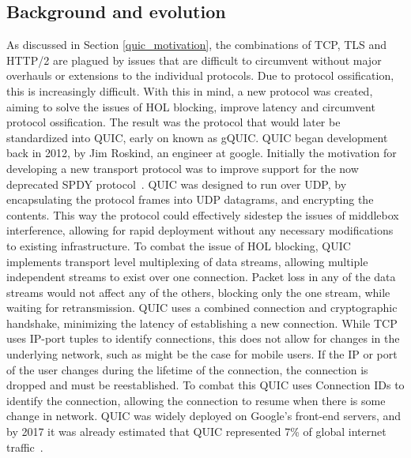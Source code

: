 \documentclass[english, 12pt, a4paper, elec, utf8, a-2b, online]{aaltothesis}
\begin{document}
\subsection{Background and evolution}
As discussed in Section \ref{quic_motivation}, the combinations of TCP, TLS and HTTP/2 are
plagued by issues that are difficult to circumvent without major overhauls or extensions to
the individual protocols. Due to protocol ossification, this is increasingly difficult. With
this in mind, a new protocol was created, aiming to solve the issues of
HOL blocking, improve latency and circumvent protocol ossification. The result
was the protocol that would later be standardized into QUIC, early on known as gQUIC.
QUIC began development back in 2012, by Jim Roskind, an engineer at google. Initially
the motivation for developing a new transport protocol was to improve support for
the now deprecated SPDY protocol~\cite{googleQUICDesign}. QUIC was designed to run over
UDP, by encapsulating the protocol frames into UDP datagrams, and encrypting the contents.
This way the protocol could effectively sidestep the issues of middlebox interference, allowing
for rapid deployment without any necessary modifications to existing infrastructure.
To combat the issue of HOL blocking, QUIC implements transport level multiplexing of
data streams, allowing multiple independent streams to exist over one connection.
Packet loss in any of the data streams would not affect any of the others, blocking
only the one stream, while waiting for retransmission. QUIC uses a combined connection and
cryptographic handshake, minimizing the latency of establishing a new connection.
While TCP uses IP-port tuples to identify connections, this does not allow for changes in the
underlying network, such as might be the case for mobile users. If the IP or port
of the user changes during the lifetime of the connection,
the connection is dropped and must be reestablished. To combat this QUIC uses
Connection IDs to identify the connection, allowing the connection to resume when
there is some change in network. QUIC was widely deployed on Google's front-end servers,
and by 2017 it was already estimated that QUIC represented 7\% of global internet
traffic~\cite{quic_transport_protocol_design}.
\end{document}
